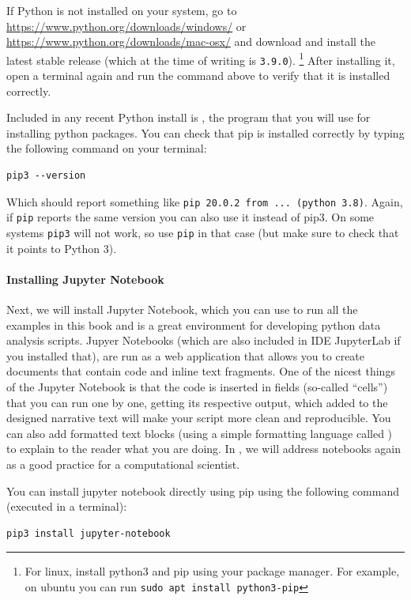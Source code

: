 If Python is not installed on your system, go to \url{https://www.python.org/downloads/windows/} or \url{https://www.python.org/downloads/mac-osx/} and download and install the latest stable release (which at the time of writing is \verb|3.9.0|).
\footnote{For linux, install python3 and pip using your package manager. For example, on ubuntu you can run \texttt{sudo apt install python3-pip}}
After installing it, open a terminal again and run the command above to verify that it is installed correctly.

Included in any recent Python install is , the program that you will use for installing python packages.
You can check that pip is installed correctly by typing the following command on your terminal:

\begin{verbatim}
pip3 --version
\end{verbatim}

Which should report something like \texttt{pip 20.0.2 from ... (python 3.8)}.
Again, if \verb|pip| reports the same version you can also use it instead of pip3.
On some systems \verb|pip3| will not work, so use \verb|pip| in that case
(but make sure to check that it points to Python 3).

\paragraph{Installing Jupyter Notebook}
Next, we will install Jupyter Notebook, which you can use to run all the examples in this book
and is a great environment for developing python data analysis scripts.
Jupyer Notebooks (which are also included in IDE JupyterLab if you installed that), 
are run as a web application
that allows you to create documents that contain code and inline text fragments.
 One of the nicest things of
the Jupyter Notebook is that the code is inserted in fields (so-called ``cells'') that you
can run one by one, getting its respective output, which added to the
designed narrative text will make your script more clean and
reproducible. You can also add formatted text blocks (using a simple formatting language called )
to explain to the reader what you are doing. In , we will address
notebooks again as a good practice for a computational scientist.

You can install jupyter notebook directly using pip using the following command
(executed in a terminal):

\begin{verbatim}
pip3 install jupyter-notebook
\end{verbatim}

